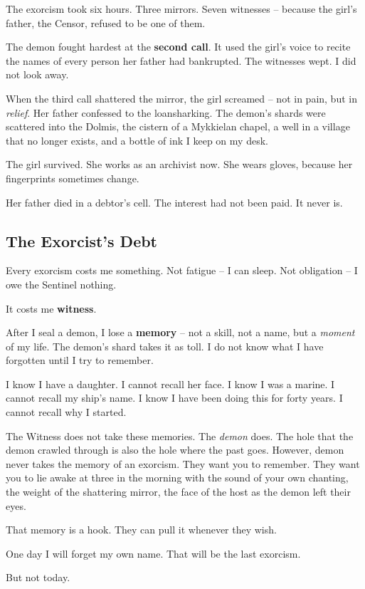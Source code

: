The exorcism took six hours. Three mirrors. Seven witnesses -- because the girl's father, the Censor, refused to be one of them.

The demon fought hardest at the \textbf{second call}. It used the girl's voice to recite the names of every person her father had bankrupted. The witnesses wept. I did not look away.

When the third call shattered the mirror, the girl screamed -- not in pain, but in \emph{relief}. Her father confessed to the loansharking. The demon's shards were scattered into the Dolmis, the cistern of a Mykkielan chapel, a well in a village that no longer exists, and a bottle of ink I keep on my desk.

The girl survived. She works as an archivist now. She wears gloves, because her fingerprints sometimes change.

Her father died in a debtor's cell. The interest had not been paid. It never is.

\subsection{The Exorcist's Debt}

Every exorcism costs me something. Not fatigue -- I can sleep. Not obligation -- I owe the Sentinel nothing.

It costs me \textbf{witness}.

After I seal a demon, I lose a \textbf{memory} -- not a skill, not a name, but a \emph{moment} of my life. The demon's shard takes it as toll. I do not know what I have forgotten until I try to remember.

I know I have a daughter. I cannot recall her face.  
I know I was a marine. I cannot recall my ship's name.  
I know I have been doing this for forty years. I cannot recall why I started.

The Witness does not take these memories. The \emph{demon} does. The hole that the demon crawled through is also the hole where the past goes. However, demon never takes the memory of an exorcism. They want you to remember. They want you to lie awake at three in the morning with the sound of your own chanting, the weight of the shattering mirror, the face of the host as the demon left their eyes.

That memory is a hook. They can pull it whenever they wish.

One day I will forget my own name. That will be the last exorcism.

But not today.

